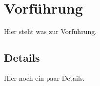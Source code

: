 \section{Vorführung}
\begin{frame}
Hier steht was zur Vorführung.
\end{frame}

\subsection{Details}
\begin{frame}
Hier noch ein paar Details.
\end{frame}